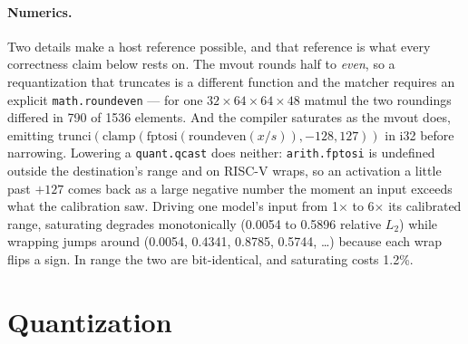 \documentclass[runningheads]{llncs}
\begin{document}
\paragraph{Numerics.} Two details make a host reference possible, and that
reference is what every correctness claim below rests on. The mvout rounds half to
\emph{even}, so a requantization that truncates is a different function and the
matcher requires an explicit \texttt{math.roundeven} --- for one
$32{\times}64 \times 64{\times}48$ matmul the two roundings differed in 790 of
1536 elements. And the compiler saturates as the mvout does, emitting
$\mathrm{trunci}(\mathrm{clamp}(\mathrm{fptosi}(\mathrm{roundeven}(x/s)),
-128,127))$ in i32 before narrowing. Lowering a \texttt{quant.qcast} does neither:
\texttt{arith.fptosi} is undefined outside the destination's range and on RISC-V
wraps, so an activation a little past $+127$ comes back as a large negative number
the moment an input exceeds what the calibration saw. Driving one model's input from 1$\times$ to 6$\times$ its
calibrated range, saturating degrades monotonically (0.0054 to 0.5896 relative
$L_2$) while wrapping jumps around (0.0054, 0.4341, 0.8785, 0.5744, \ldots) because
each wrap flips a sign. In range the two are bit-identical, and saturating costs
1.2\%.

\section{Quantization}
\label{sec:quant}
\end{document}
